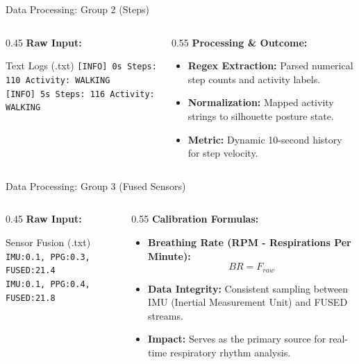 \documentclass[aspectratio=169]{beamer}
\begin{document}
\begin{frame}{Data Processing: Group 2 (Steps)}
    \begin{columns}
        \begin{column}{0.45\textwidth}
            \textbf{Raw Input:}
            \begin{exampleblock}{Text Logs (.txt)}
                \texttt{\small [INFO] 0s Steps: 110 Activity: WALKING}\\
                \texttt{\small [INFO] 5s Steps: 116 Activity: WALKING}
            \end{exampleblock}
        \end{column}
        \begin{column}{0.55\textwidth}
            \textbf{Processing \& Outcome:}
            \begin{itemize}
                \item \textbf{Regex Extraction:} Parsed numerical step counts and activity labels.
                \item \textbf{Normalization:} Mapped activity strings to silhouette posture state.
                \item \textbf{Metric:} Dynamic 10-second history for step velocity.
            \end{itemize}
        \end{column}
    \end{columns}
\end{frame}

\begin{frame}{Data Processing: Group 3 (Fused Sensors)}
    \begin{columns}
        \begin{column}{0.45\textwidth}
            \textbf{Raw Input:}
            \begin{exampleblock}{Sensor Fusion (.txt)}
                \texttt{\small IMU:0.1, PPG:0.3, FUSED:21.4}\\
                \texttt{\small IMU:0.1, PPG:0.4, FUSED:21.8}
            \end{exampleblock}
        \end{column}
        \begin{column}{0.55\textwidth}
            \textbf{Calibration Formulas:}
            \begin{itemize}
                \item \textbf{Breathing Rate (RPM - Respirations Per Minute):}
                      \[ BR = F_{raw} \]
                \item \textbf{Data Integrity:} Consistent sampling between IMU (Inertial Measurement Unit) and FUSED streams.
                \item \textbf{Impact:} Serves as the primary source for real-time respiratory rhythm analysis.
            \end{itemize}
        \end{column}
    \end{columns}
\end{frame}
\end{document}
